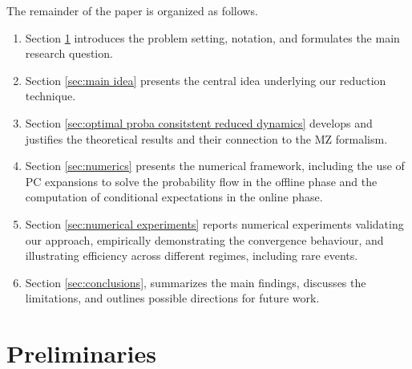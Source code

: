 \documentclass[11pt, a4paper, oneside, reqno]{amsart}
\begin{document}
The remainder of the paper is organized  as follows.
\begin{enumerate}
\item Section \ref{sec:notation and main problem} introduces the problem setting, notation, and formulates the main research question.
\item Section \ref{sec:main idea} presents the central idea underlying our reduction technique. 
\item Section \ref{sec:optimal proba consitstent reduced dynamics} develops and justifies the theoretical results and their connection to the MZ formalism.
\item  Section \ref{sec:numerics} presents the numerical framework, including the use of PC expansions to solve the probability flow in the offline phase and the computation of conditional expectations in the online phase.
\item Section \ref{sec:numerical experiments} reports numerical experiments validating our approach, empirically demonstrating  the convergence behaviour, and illustrating efficiency across different regimes, including rare events. 
\item Section \ref{sec:conclusions}, summarizes the main findings, discusses the limitations, and outlines possible directions for future work. 
\end{enumerate}
\section{Preliminaries}\label{sec:notation and main problem}
\end{document}
